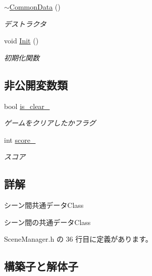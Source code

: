 \begin{DoxyCompactItemize}
\mbox{\hyperlink{class_scene_manager_1_1_common_data_a3e9a53b32ec3fc2efb5f375d10597cea}{$\sim$\+Common\+Data}} ()
\begin{DoxyCompactList}\small\item\em デストラクタ \end{DoxyCompactList}\item 
void \mbox{\hyperlink{class_scene_manager_1_1_common_data_aaea4c2121bc62ed78e62d867ac951a10}{Init}} ()
\begin{DoxyCompactList}\small\item\em 初期化関数 \end{DoxyCompactList}\end{DoxyCompactItemize}
\subsection*{非公開変数類}
\begin{DoxyCompactItemize}
\item 
bool \mbox{\hyperlink{class_scene_manager_1_1_common_data_a467635269880aaf0e5983389cc2ca657}{is\+\_\+clear\+\_\+}}
\begin{DoxyCompactList}\small\item\em ゲームをクリアしたかフラグ \end{DoxyCompactList}\item 
int \mbox{\hyperlink{class_scene_manager_1_1_common_data_a3ade74be49e90158640b6105a46de8e5}{score\+\_\+}}
\begin{DoxyCompactList}\small\item\em スコア \end{DoxyCompactList}\end{DoxyCompactItemize}


\subsection{詳解}
シーン間共通データ\+Class 

シーン間の共通データ\+Class 

 Scene\+Manager.\+h の 36 行目に定義があります。



\subsection{構築子と解体子}
\mbox{\label{class_scene_manager_1_1_common_data_a0dca4788d1d0eec89c18b29f3c4ca678}} 
